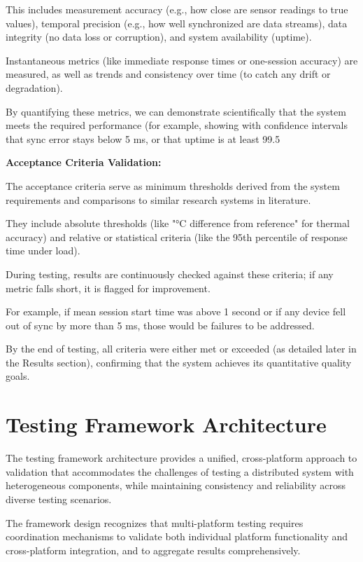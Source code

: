 {{This includes measurement accuracy (e.g., how close are sensor readings to true
values), temporal precision (e.g., how well synchronized are data streams), data
integrity (no data loss or corruption), and system availability (uptime).

Instantaneous metrics (like immediate response times or one-session accuracy) are
measured, as well as trends and consistency over time (to catch any drift or
degradation).

By quantifying these metrics, we can demonstrate scientifically that the system meets
the required performance (for example, showing with confidence intervals that sync
error stays below 5 ms, or that uptime is at least 99.5%

\textbf{Acceptance Criteria Validation:}

The acceptance criteria serve as minimum thresholds derived from the system
requirements and comparisons to similar research systems in literature.

They include absolute thresholds (like "°C difference from reference" for
thermal accuracy) and relative or statistical criteria (like the 95th percentile of
response time under load).

During testing, results are continuously checked against these criteria; if any
metric falls short, it is flagged for improvement.

For example, if mean session start time was above 1 second or if any device fell out
of sync by more than 5 ms, those would be failures to be addressed.

By the end of testing, all criteria were either met or exceeded (as detailed later in
the Results section), confirming that the system achieves its quantitative quality
goals.

\section{Testing Framework Architecture}

The testing framework architecture provides a unified, cross-platform approach to
validation that accommodates the challenges of testing a distributed system with
heterogeneous components, while maintaining consistency and reliability across
diverse testing scenarios.

The framework design recognizes that multi-platform testing requires
coordination mechanisms to validate both individual platform functionality and
cross-platform integration, and to aggregate results comprehensively.

}}
